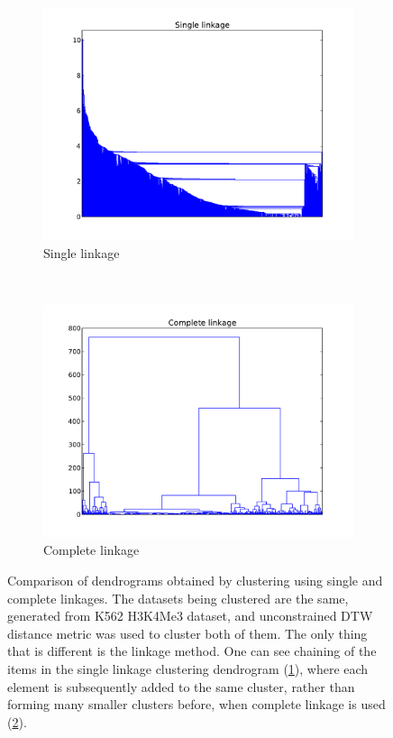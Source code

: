 \documentclass[parskip]{cs4rep}
\newcommand{\histonemodification}[1]{#1}
\newcommand{\celltype}[1]{#1}
\begin{document}
\begin{figure}
    \centering
    \begin{subfigure}[b]{0.45\textwidth}
        \centering
        \includegraphics[width=\textwidth]{figures/clustering/linkage_single.pdf}
        \caption{Single linkage}
        \label{fig:clustering:dendrogram:single}
    \end{subfigure}
    ~
    \begin{subfigure}[b]{0.45\textwidth}
        \centering
        \includegraphics[width=\textwidth]{figures/clustering/linkage_complete.pdf}
        \caption{Complete linkage}
        \label{fig:clustering:dendrogram:complete}
    \end{subfigure}
    \caption{Comparison of dendrograms obtained by clustering using single and complete linkages. The datasets being clustered are the same, generated from \celltype{K562} \histonemodification{H3K4Me3} dataset, and unconstrained DTW distance metric was used to cluster both of them. The only thing that is different is the linkage method.
      One can see chaining of the items in the single linkage clustering  dendrogram (\ref{fig:clustering:dendrogram:single}), where each element is subsequently added to the same cluster, rather than forming many smaller clusters before, when complete linkage is used (\ref{fig:clustering:dendrogram:complete}).}
    \label{fig:clustering:dendrogram}
\end{figure}
\end{document}
